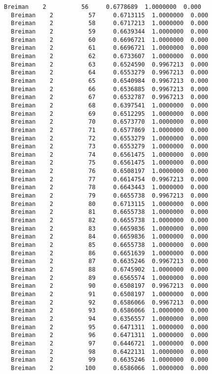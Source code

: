 \documentclass[11pt]{article}
\begin{document}
\begin{Verbatim}[commandchars=\\\{\}]
  Breiman    2          56     0.6778689  1.0000000  0.000
  Breiman    2          57     0.6713115  1.0000000  0.000
  Breiman    2          58     0.6717213  1.0000000  0.000
  Breiman    2          59     0.6639344  1.0000000  0.000
  Breiman    2          60     0.6696721  1.0000000  0.000
  Breiman    2          61     0.6696721  1.0000000  0.000
  Breiman    2          62     0.6733607  1.0000000  0.000
  Breiman    2          63     0.6524590  0.9967213  0.000
  Breiman    2          64     0.6553279  0.9967213  0.000
  Breiman    2          65     0.6540984  0.9967213  0.000
  Breiman    2          66     0.6536885  0.9967213  0.000
  Breiman    2          67     0.6532787  0.9967213  0.000
  Breiman    2          68     0.6397541  1.0000000  0.000
  Breiman    2          69     0.6512295  1.0000000  0.000
  Breiman    2          70     0.6573770  1.0000000  0.000
  Breiman    2          71     0.6577869  1.0000000  0.000
  Breiman    2          72     0.6553279  1.0000000  0.000
  Breiman    2          73     0.6553279  1.0000000  0.000
  Breiman    2          74     0.6561475  1.0000000  0.000
  Breiman    2          75     0.6561475  1.0000000  0.000
  Breiman    2          76     0.6508197  1.0000000  0.000
  Breiman    2          77     0.6614754  0.9967213  0.000
  Breiman    2          78     0.6643443  1.0000000  0.000
  Breiman    2          79     0.6655738  0.9967213  0.000
  Breiman    2          80     0.6713115  1.0000000  0.000
  Breiman    2          81     0.6655738  1.0000000  0.000
  Breiman    2          82     0.6655738  1.0000000  0.000
  Breiman    2          83     0.6659836  1.0000000  0.000
  Breiman    2          84     0.6659836  1.0000000  0.000
  Breiman    2          85     0.6655738  1.0000000  0.000
  Breiman    2          86     0.6651639  1.0000000  0.000
  Breiman    2          87     0.6635246  0.9967213  0.000
  Breiman    2          88     0.6745902  1.0000000  0.000
  Breiman    2          89     0.6565574  1.0000000  0.000
  Breiman    2          90     0.6508197  0.9967213  0.000
  Breiman    2          91     0.6508197  1.0000000  0.000
  Breiman    2          92     0.6586066  0.9967213  0.000
  Breiman    2          93     0.6586066  1.0000000  0.000
  Breiman    2          94     0.6356557  1.0000000  0.000
  Breiman    2          95     0.6471311  1.0000000  0.000
  Breiman    2          96     0.6471311  1.0000000  0.000
  Breiman    2          97     0.6446721  1.0000000  0.000
  Breiman    2          98     0.6422131  1.0000000  0.000
  Breiman    2          99     0.6635246  1.0000000  0.000
  Breiman    2         100     0.6586066  1.0000000  0.000

\end{Verbatim}
\end{document}

